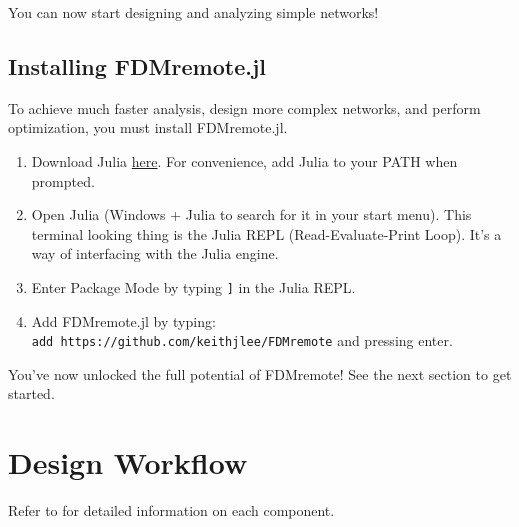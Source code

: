 \documentclass{ol-softwaremanual}
\begin{document}
You can now start designing and analyzing simple networks!

\subsection{Installing FDMremote.jl} \label{installjulia}
To achieve much faster analysis, design more complex networks, and perform optimization, you must install FDMremote.jl. 

\begin{enumerate}
    \item Download Julia \href{https://julialang.org/downloads/}{here}. For convenience, add Julia to your PATH when prompted.
    \item Open Julia (Windows + Julia to search for it in your start menu). This terminal looking thing is the Julia REPL (Read-Evaluate-Print Loop). It's a way of interfacing with the Julia engine.
    \item Enter Package Mode by typing \texttt{]} in the Julia REPL.
    \item Add FDMremote.jl by typing:\\ \texttt{add https://github.com/keithjlee/FDMremote} and pressing enter.
\end{enumerate}

 You've now unlocked the full potential of FDMremote! See the next section to get started.

\newpage
\section{Design Workflow} \label{sec:workflow}
Refer to  for detailed information on each component. 



\newpage
\end{document}
